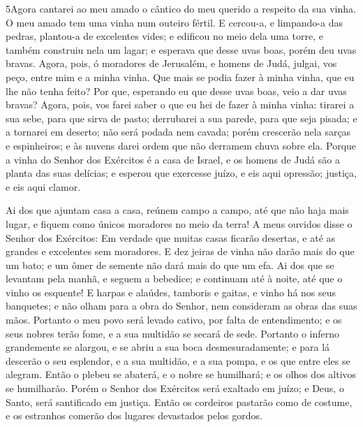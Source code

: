 \lettrine{5}{}Agora cantarei ao meu amado o cântico do meu
querido a respeito da sua vinha. O meu amado tem uma vinha num
outeiro fértil. E cercou-a, e limpando-a das pedras, plantou-a
de excelentes vides; e edificou no meio dela uma torre, e também
construiu nela um lagar; e esperava que desse uvas boas, porém deu
uvas bravas. Agora, pois, ó moradores de Jerusalém, e homens de
Judá, julgai, vos peço, entre mim e a minha vinha. Que mais se
podia fazer à minha vinha, que eu lhe não tenha feito? Por que,
esperando eu que desse uvas boas, veio a dar uvas bravas? Agora,
pois, vos farei saber o que eu hei de fazer à minha vinha: tirarei a
sua sebe, para que sirva de pasto; derrubarei a sua parede, para que
seja pisada; e a tornarei em deserto; não será podada nem
cavada; porém crescerão nela sarças e espinheiros; e às nuvens darei
ordem que não derramem chuva sobre ela. Porque a vinha do Senhor
dos Exércitos é a casa de Israel, e os homens de Judá são a planta
das suas delícias; e esperou que exercesse juízo, e eis aqui
opressão; justiça, e eis aqui clamor.

Ai dos que ajuntam casa a casa, reúnem campo a campo, até que não
haja mais lugar, e fiquem como únicos moradores no meio da terra!
A meus ouvidos disse o Senhor dos Exércitos: Em verdade que
muitas casas ficarão desertas, e até as grandes e excelentes sem
moradores. E dez jeiras de vinha não darão mais do que um
bato; e um ômer de semente não dará mais do que um efa. Ai
dos que se levantam pela manhã, e seguem a bebedice; e continuam até
à noite, até que o vinho os esquente! E harpas e alaúdes,
tamboris e gaitas, e vinho há nos seus banquetes; e não olham para a
obra do Senhor, nem consideram as obras das suas mãos.
Portanto o meu povo será levado cativo, por falta de
entendimento; e os seus nobres terão fome, e a sua multidão se
secará de sede. Portanto o inferno grandemente se alargou, e
se abriu a sua boca desmesuradamente; e para lá descerão o seu
esplendor, e a sua multidão, e a sua pompa, e os que entre eles se
alegram. Então o plebeu se abaterá, e o nobre se humilhará; e
os olhos dos altivos se humilharão. Porém o Senhor dos
Exércitos será exaltado em juízo; e Deus, o Santo, será santificado
em justiça. Então os cordeiros pastarão como de costume, e os
estranhos comerão dos lugares devastados pelos gordos.

